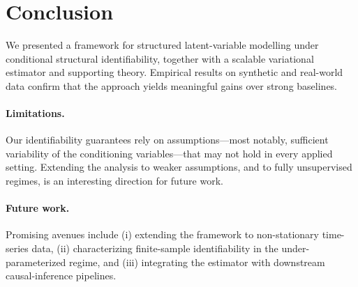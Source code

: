 \section{Conclusion}\label{sec:conclusion}
We presented a framework for structured latent-variable modelling under conditional structural identifiability, together with a scalable variational estimator and supporting theory.
Empirical results on synthetic and real-world data confirm that the approach yields meaningful gains over strong baselines.

\paragraph{Limitations.}
Our identifiability guarantees rely on assumptions—most notably, sufficient variability of the conditioning variables—that may not hold in every applied setting.
Extending the analysis to weaker assumptions, and to fully unsupervised regimes, is an interesting direction for future work.

\paragraph{Future work.}
Promising avenues include (i) extending the framework to non-stationary time-series data, (ii) characterizing finite-sample identifiability in the under-parameterized regime, and (iii) integrating the estimator with downstream causal-inference pipelines.
